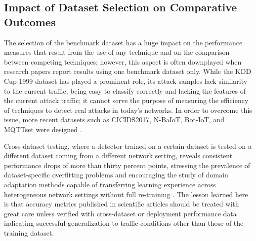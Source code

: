 \documentclass[12pt]{article}
\begin{document}
\subsection{Impact of Dataset Selection on Comparative Outcomes}

The selection of the benchmark dataset has a huge impact on the performance measures that result from the use of any technique and on the comparison between competing techniques; however, this aspect is often downplayed when research papers report results using one benchmark dataset only. While the KDD Cup 1999 dataset has played a prominent role, its attack samples lack similarity to the current traffic, being easy to classify correctly and lacking the features of the current attack traffic; it cannot serve the purpose of measuring the efficiency of techniques to detect real attacks in today’s networks. In order to overcome this issue, more recent datasets such as CICIDS2017, N-BaIoT, Bot-IoT, and MQTTset were designed \cite{meidan2018n}.

Cross-dataset testing, where a detector trained on a certain dataset is tested on a different dataset coming from a different network setting, reveals consistent performance drops of more than thirty percent points, stressing the prevalence of dataset-specific overfitting problems and encouraging the study of domain adaptation methods capable of transferring learning experience across heterogeneous network settings without full re-training \cite{zhang2019hybrid}. The lesson learned here is that accuracy metrics published in scientific articles should be treated with great care unless verified with cross-dataset or deployment performance data indicating successful generalization to traffic conditions other than those of the training dataset.
\end{document}
